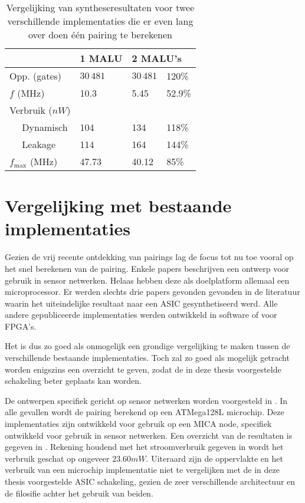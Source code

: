 \begin{table}[h]
	\caption{Vergelijking van syntheseresultaten voor twee verschillende implementaties die er even lang over doen \'e\'en pairing te berekenen}
	\label{tabel-resultaten-m1-vs-m2}

	\centering
	\begin{tabular}{lll@{$\;\;$}l}
		\toprule
		& 1 MALU	& \multicolumn{2}{l}{2 MALU's}\\
		\midrule
		Opp. (gates)				& $30\,481$	& $30\,481$	& 120\% \\
		$f$ (MHz)					& 10.3		& 5.45		& 52.9\% \\ 
		Verbruik ($nW$)			& 				& 				& \\
		$\quad$ Dynamisch			& 104			& 134			& 118\% \\
		$\quad$ Leakage			& 114			& 164			& 144\% \\
		$f_{\text{max}}$ (MHz)	& 47.73		& 40.12		& 85\% \\
		\bottomrule	
	\end{tabular}
\end{table}

\section{Vergelijking met bestaande implementaties}

Gezien de vrij recente ontdekking van pairings lag de focus tot nu toe vooral op het snel berekenen van de pairing. Enkele papers beschrijven een ontwerp voor gebruik in sensor netwerken. Helaas hebben deze als doelplatform allemaal een microprocessor. Er werden slechts drie papers gevonden gevonden in de literatuur waarin het uiteindelijke resultaat naar een ASIC gesynthetiseerd werd. Alle andere  gepubliceerde implementaties werden ontwikkeld in software of voor FPGA's.

Het is dus zo goed als onmogelijk een grondige vergelijking te maken tussen de verschillende bestaande implementaties. Toch zal zo goed als mogelijk getracht worden enigszins een overzicht te geven, zodat de in deze thesis voorgestelde schakeling beter geplaats kan worden.

De ontwerpen specifiek gericht op sensor netwerken worden voorgesteld in \cite{tinypbc, tinytate, nanoecc}. In alle gevallen wordt de pairing berekend op een ATMega128L microchip. Deze implementaties zijn ontwikkeld voor gebruik op een MICA node, specifiek ontwikkeld voor gebruik in sensor netwerken. Een overzicht van de resultaten is gegeven in . Rekening houdend met het stroomverbruik gegeven in \cite{nanoecc} wordt het verbruik geschat op ongeveer $23.60mW$. Uiteraard zijn de oppervlakte en het verbruik van een microchip implementatie niet te vergelijken met de in deze thesis voorgestelde ASIC schakeling, gezien de zeer verschillende architectuur en de filosifie achter het gebruik van beiden.

